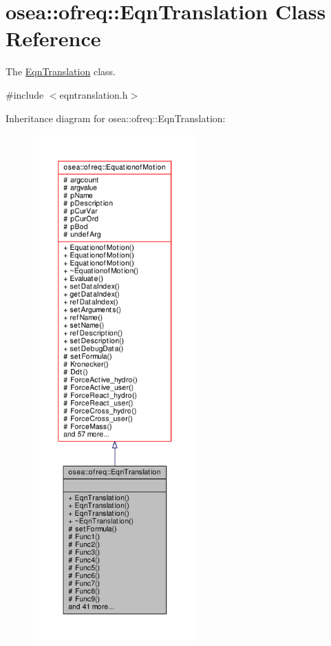 \hypertarget{classosea_1_1ofreq_1_1_eqn_translation}{\section{osea\-:\-:ofreq\-:\-:Eqn\-Translation Class Reference}
\label{classosea_1_1ofreq_1_1_eqn_translation}
}


The \hyperlink{classosea_1_1ofreq_1_1_eqn_translation}{Eqn\-Translation} class.  




{\ttfamily \#include $<$eqntranslation.\-h$>$}



Inheritance diagram for osea\-:\-:ofreq\-:\-:Eqn\-Translation\-:
\nopagebreak
\begin{figure}[H]
\begin{center}
\leavevmode
\includegraphics[height=550pt]{classosea_1_1ofreq_1_1_eqn_translation__inherit__graph}
\end{center}
\end{figure}
